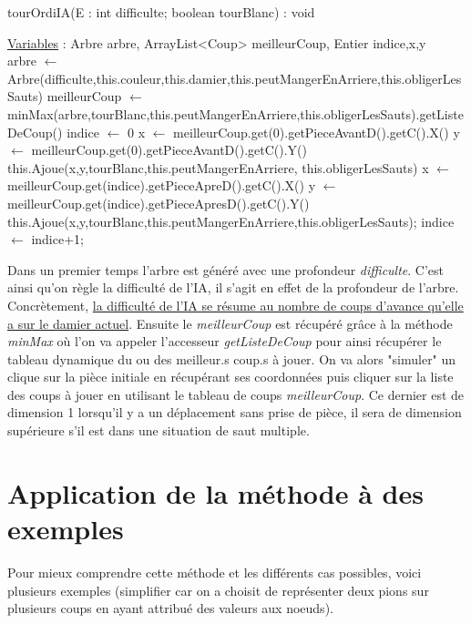 \documentclass[12,french]{report}
\begin{document}
\begin{algorithm}
	\caption{tourOrdiIA(E : int difficulte; boolean tourBlanc) : void}
	\begin{algorithmic}
	\State \underline{Variables} : Arbre arbre, ArrayList<Coup> meilleurCoup, Entier indice,x,y\\
	\State arbre $\leftarrow$ Arbre(difficulte,this.couleur,this.damier,this.peutMangerEnArriere,this.obligerLesSauts)
	\State meilleurCoup $\leftarrow$ minMax(arbre,tourBlanc,this.peutMangerEnArriere,this.obligerLesSauts).getListeDeCoup()
	\State indice $\leftarrow$ 0
	\State x $\leftarrow$ meilleurCoup.get(0).getPieceAvantD().getC().X()
	\State y $\leftarrow$ meilleurCoup.get(0).getPieceAvantD().getC().Y()
	\State this.Ajoue(x,y,tourBlanc,this.peutMangerEnArriere, this.obligerLesSauts)
	\State x $\leftarrow$ meilleurCoup.get(indice).getPieceApreD().getC().X()
	\State y $\leftarrow$ meilleurCoup.get(indice).getPieceApresD().getC().Y()
	\State this.Ajoue(x,y,tourBlanc,this.peutMangerEnArriere,this.obligerLesSauts);
	\State indice $\leftarrow$ indice+1;
	\EndWhile
	\end{algorithmic}
\end{algorithm}\vspace{0.4cm}

Dans un premier temps l'arbre est généré avec une profondeur \textit{difficulte}. C'est ainsi qu'on règle la difficulté de l'IA, il s'agit en effet de la profondeur de l'arbre. Concrètement, \uline{la difficulté de l'IA se résume au nombre de coups d'avance qu'elle a sur le damier actuel}. Ensuite le \textit{meilleurCoup} est récupéré grâce à la méthode \textit{minMax} où l'on va appeler l'accesseur \textit{getListeDeCoup} pour ainsi récupérer le tableau dynamique du ou des meilleur.s coup.s à jouer. On va alors "simuler" un clique sur la pièce initiale en récupérant ses coordonnées puis cliquer sur la liste des coups à jouer en utilisant le tableau de coups \textit{meilleurCoup}. Ce dernier est de dimension 1 lorsqu'il y a un déplacement sans prise de pièce, il sera de dimension supérieure s'il est dans une situation de saut multiple.

\section{Application de la méthode à des exemples}

Pour mieux comprendre cette méthode et les différents cas possibles,
voici plusieurs exemples (simplifier car on a choisit de représenter
deux pions sur plusieurs coups en ayant attribué des valeurs aux noeuds).
\end{document}
